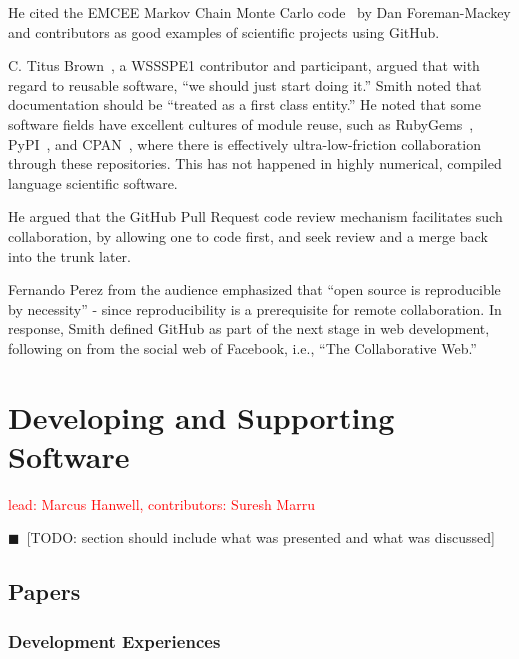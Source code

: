 \documentclass[11pt, oneside]{amsart}
\newcommand{\todo}[1]{{\color{blue}$\blacksquare$~\textsf{[TODO: #1]}}}
\newcommand{\note}[1]{ {\textcolor{red}    { #1 }}}
\begin{document}
He cited the EMCEE Markov Chain Monte Carlo code~\cite{emcee-web} by
Dan Foreman-Mackey and contributors as good examples of scientific
projects using GitHub.

C. Titus Brown~\cite{ged-web}, a WSSSPE1 contributor and participant, argued that with regard to reusable
software, ``we should just start doing it.'' Smith noted that
documentation should be ``treated as a first class entity.''  He noted
that some software fields have excellent cultures of module reuse,
such as RubyGems~\cite{rubygems-web}, PyPI~\cite{pypi-web}, and
CPAN~\cite{cpan-web}, where there is effectively ultra-low-friction
collaboration through these repositories. This has not happened in
highly numerical, compiled language scientific software.

He argued that the GitHub Pull Request code review mechanism
facilitates such collaboration, by allowing one to code first, and
seek review and a merge back into the trunk later.

Fernando Perez from the audience emphasized that ``open source is reproducible by
necessity'' - since reproducibility is a prerequisite for remote
collaboration. In response, Smith defined GitHub as part of the next
stage in web development, following on from the social web of
Facebook, i.e., ``The Collaborative Web.''

\section{Developing and Supporting Software} \label{sec:devel}

\note{lead: Marcus Hanwell, contributors: Suresh Marru}

\todo{section should include what was presented and what was discussed}

\subsection{Papers}

\subsubsection*{Development Experiences}
\end{document}
